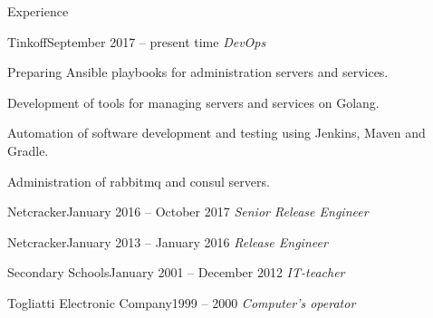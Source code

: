 \documentclass{resume} %
\begin{document}
\begin{rSection}{Experience}

\begin{rSubsection}{Tinkoff}{September 2017 -- present time}{}{} %
{\em DevOps\/} \par
\item Preparing Ansible playbooks for administration servers and services.
\item Development of tools for managing servers and services on Golang.
\item Automation of software development and testing using Jenkins, Maven and Gradle.
\item Administration of rabbitmq and consul servers.
\end{rSubsection}

\begin{rSubsection}{Netcracker}{January 2016 -- October 2017}{}{} %
{\em Senior Release Engineer\/} \par
\end{rSubsection}

\begin{rSubsection}{Netcracker}{January 2013 -- January 2016}{}{} %
{\em Release Engineer\/} \par
\end{rSubsection}

\begin{rSubsection}{Secondary Schools}{January 2001 -- December 2012}{}{} %
{\em IT-teacher\/}
\end{rSubsection}

\begin{rSubsection}{Togliatti Electronic Company}{1999 -- 2000}{}{} %
{\em Computer's operator\/}
\end{rSubsection}




\end{rSection}
\end{document}
